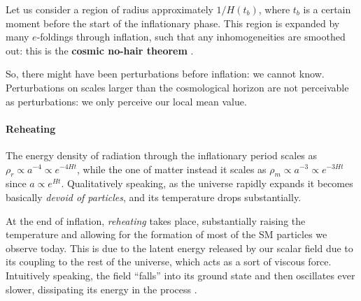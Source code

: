 \documentclass[main.tex]{subfiles}
\begin{document}

Let us consider a region of radius approximately \(1 / H(t_b)\), where \(t_b\) is a certain moment before the start of the inflationary phase.
This region is expanded by many \(e\)-foldings through inflation, such that any inhomogeneities are smoothed out: this is the \textbf{cosmic no-hair theorem} \cite[pag.\ 159]{LucchinColes:2002}.



So, there might have been perturbations before inflation: we cannot know.
Perturbations on scales larger than the cosmological horizon are not perceivable as perturbations: we only perceive our local mean value.


\paragraph{Reheating}

The energy density of radiation through the inflationary period scales as \(\rho _r \propto a^{-4} \propto e^{-4 Ht}\), while the one of matter instead it scales as \(\rho _m \propto a^{-3} \propto e^{-3Ht}\) since \(a \propto e^{Ht}\).
Qualitatively speaking, as the universe rapidly expands it becomes basically \emph{devoid of particles}, and its temperature drops substantially.

At the end of inflation, \emph{reheating} takes place, substantially raising the temperature and allowing for the formation of most of the SM particles we observe today.
This is due to the latent energy released by our scalar field due to its coupling to the rest of the universe, which acts as a sort of viscous force.
Intuitively speaking, the field ``falls'' into its ground state and then oscillates ever slower, dissipating its energy in the process \cite[fig.\ 7.6]{LucchinColes:2002}. 
\end{document}
